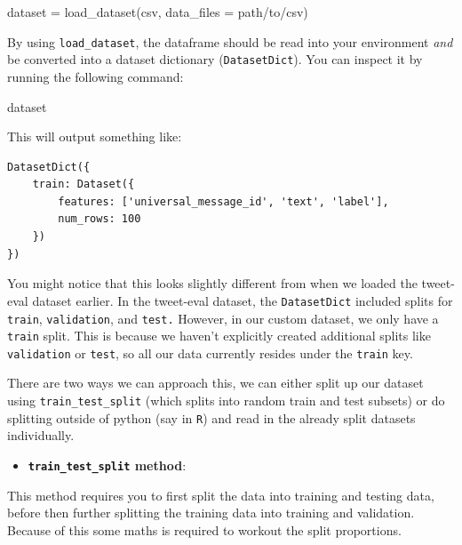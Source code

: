 \documentclass[
  letterpaper,
  DIV=11,
  numbers=noendperiod]{scrreprt}
\newenvironment{Shaded}{\begin{snugshade}}{\end{snugshade}}
\newcommand{\NormalTok}[1]{\textcolor[rgb]{0.00,0.23,0.31}{#1}}
\newcommand{\OperatorTok}[1]{\textcolor[rgb]{0.37,0.37,0.37}{#1}}
\newcommand{\StringTok}[1]{\textcolor[rgb]{0.13,0.47,0.30}{#1}}
\providecommand{\tightlist}{%
  \setlength{\itemsep}{0pt}\setlength{\parskip}{0pt}}\usepackage{longtable,booktabs,array}
\begin{document}
\begin{Shaded}
\begin{Highlighting}[]
\NormalTok{dataset }\OperatorTok{=}\NormalTok{ load\_dataset(}\StringTok{\textquotesingle{}csv\textquotesingle{}}\NormalTok{, data\_files }\OperatorTok{=}\NormalTok{ path}\OperatorTok{/}\NormalTok{to}\OperatorTok{/}\NormalTok{csv)}
\end{Highlighting}
\end{Shaded}

By using \texttt{load\_dataset}, the dataframe should be read into your
environment \emph{and} be converted into a dataset dictionary
(\texttt{DatasetDict}). You can inspect it by running the following
command:

\begin{Shaded}
\begin{Highlighting}[]
\NormalTok{dataset}
\end{Highlighting}
\end{Shaded}

This will output something like:

\begin{verbatim}
DatasetDict({
    train: Dataset({
        features: ['universal_message_id', 'text', 'label'],
        num_rows: 100
    })
})
\end{verbatim}

You might notice that this looks slightly different from when we loaded
the tweet-eval dataset earlier. In the tweet-eval dataset, the
\texttt{DatasetDict} included splits for \texttt{train},
\texttt{validation}, and \texttt{test.} However, in our custom dataset,
we only have a \texttt{train} split. This is because we haven't
explicitly created additional splits like \texttt{validation} or
\texttt{test}, so all our data currently resides under the
\texttt{train} key.

There are two ways we can approach this, we can either split up our
dataset using \texttt{train\_test\_split} (which splits into random
train and test subsets) or do splitting outside of python (say in
\texttt{R}) and read in the already split datasets individually.

\begin{itemize}
\tightlist
\item
  \textbf{\texttt{train\_test\_split} method}:
\end{itemize}

This method requires you to first split the data into training and
testing data, before then further splitting the training data into
training and validation. Because of this some maths is required to
workout the split proportions.
\end{document}
